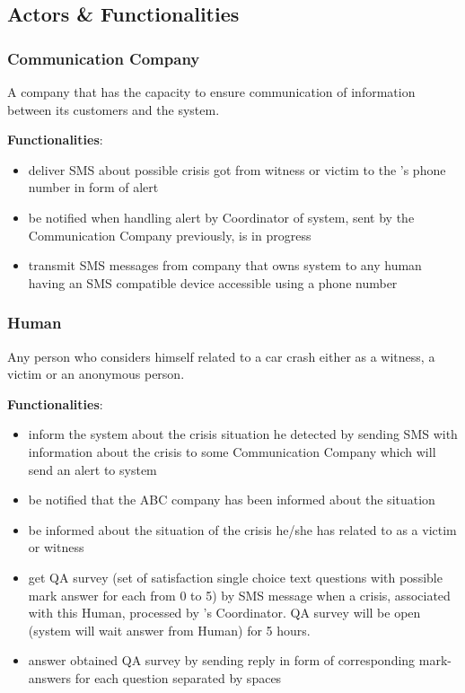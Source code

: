 \subsection{Actors \& Functionalities}


\subsubsection{Communication Company}
A company that has the capacity to ensure communication of information between
its customers and the \mysystemname system. 

\textbf{Functionalities}:

\begin{itemize}
  \item deliver SMS about possible crisis got from witness or victim to the
  \mysystemname's phone number in form of alert
  \item be notified when handling alert by Coordinator of \mysystemname system,
  sent by the Communication Company previously, is in progress
  \item transmit SMS messages from company that owns \mysystemname system to any
  human having an SMS compatible device accessible using a phone number
\end{itemize}

\subsubsection{Human}
Any person who considers himself related to a car crash either as a
witness, a victim or an anonymous person. 

\textbf{Functionalities}:

\begin{itemize}
  \item inform the \mysystemname system about the crisis situation he detected
  by sending SMS with information about the crisis to some Communication Company
  which will send an alert to \mysystemname system
  \item be notified that the ABC company has been informed about the situation
  \item be informed about the situation of the crisis he/she has related to as a
  victim or witness
  \item get QA survey (set of satisfaction single choice text questions with
  possible mark answer for each from 0 to 5) by SMS message when a crisis,
  associated with this Human, processed by \mysystemname's Coordinator. QA
  survey will be open (\mysystemname system will wait answer from Human) for 5
  hours.
  \item answer obtained QA survey by sending reply in form of corresponding
  mark-answers for each question separated by spaces
\end{itemize}


